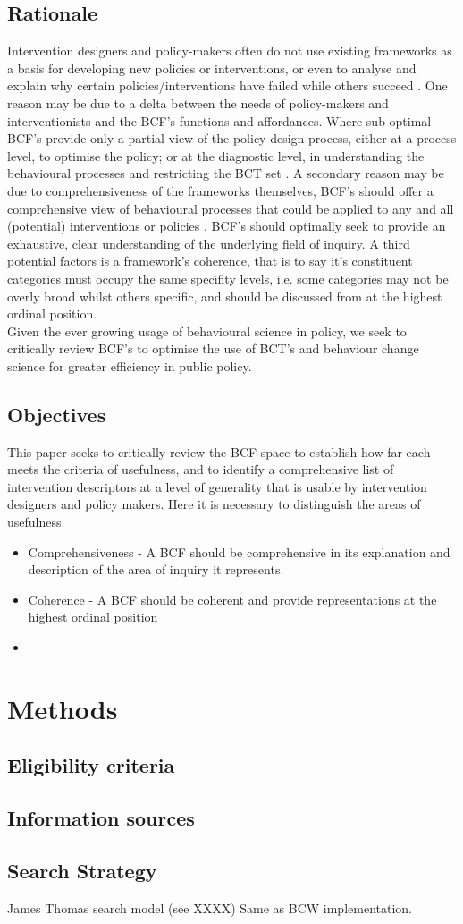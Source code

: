 \documentclass[titlepage,onecolumn,showpacs,nofootinbib,aps,superscriptaddress,eqsecnum,prd,notitlepage,showkeys,12pt]{article}
\begin{document}
\subsection{Rationale}
 Intervention designers and policy-makers often do not use existing frameworks as a basis for developing new policies or interventions, or even to analyse and explain why certain policies/interventions have failed while others succeed \citep{BCW}. One reason may be due to a delta between the needs of policy-makers and interventionists and the BCF's functions and affordances. Where sub-optimal BCF's provide only a partial view of the policy-design process, either at a process level, to optimise the policy; or at the diagnostic level, in understanding the behavioural processes and restricting the BCT set \citep{davis2015theories}. A secondary reason may be due to comprehensiveness of the frameworks themselves, BCF's should offer a comprehensive view of behavioural processes that could be applied to any and all (potential) interventions or policies \citep{BCW}. BCF's should optimally seek to provide an exhaustive, clear understanding of the underlying field of inquiry. A third potential factors is a framework's coherence, that is to say it's constituent categories must occupy the same specifity levels, i.e. some categories may not be overly broad whilst others specific, and should be discussed from at the highest ordinal position.\\
\indent Given the ever growing usage of behavioural science in policy, we seek to critically review BCF's to optimise the use of BCT's and behaviour change science for  greater efficiency in public policy.
\subsection{Objectives}
This paper seeks to critically review the BCF space to establish how far each meets the criteria of usefulness, and to identify a comprehensive list of intervention descriptors at a level of generality that is usable by intervention designers and policy makers. Here it is necessary to distinguish the areas of usefulness.
\begin{itemize}
    \item Comprehensiveness - A BCF should be comprehensive in its explanation and description of the area of inquiry it represents.
    \item Coherence - A BCF should be coherent and provide representations at the highest ordinal position 
    \item 
\end{itemize}
\section{Methods}
\subsection{Eligibility criteria}
\subsection{Information sources}
\subsection{Search Strategy}
James Thomas search model (see XXXX)
Same as BCW implementation. 
\newpage


\end{document}
